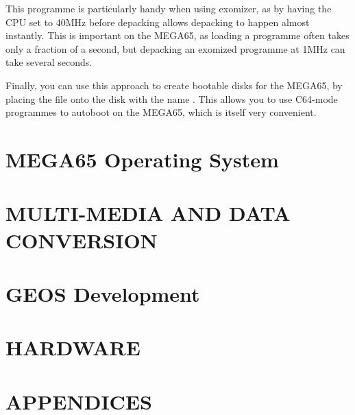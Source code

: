 This programme is particularly handy when using exomizer, as by having
the CPU set to 40MHz before depacking allows depacking to happen
almost instantly.  This is important on the MEGA65, as loading a
programme often takes only a fraction of a second, but depacking an
exomized programme at 1MHz can take several seconds.

Finally, you can use this approach to create bootable disks for the
MEGA65, by placing the file onto the disk with the
name .  This allows you to use C64-mode programmes
to autoboot on the MEGA65, which is itself very convenient.

\part{MEGA65 Operating System}



\part{MULTI-MEDIA AND DATA CONVERSION}

\part{GEOS Development}

\part{HARDWARE}



\part{APPENDICES}

\begin{appendices}

  
  
  
  
\end{appendices}


\nocite{*}



\printindex



